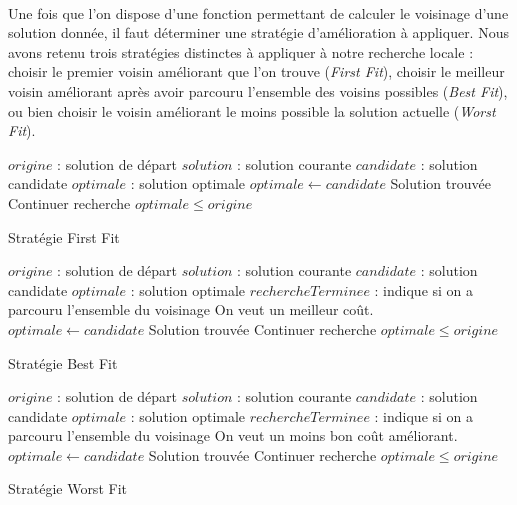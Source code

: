 \documentclass[a4paper,10pt]{report}
\begin{document}
\paragraph{}
  Une fois que l'on dispose d'une fonction permettant de calculer le voisinage
d'une solution donnée, il faut déterminer une stratégie d'amélioration à
appliquer. Nous avons retenu trois stratégies distinctes à appliquer à notre
recherche locale : choisir le premier voisin améliorant que l'on trouve
(\textit{First Fit}), choisir le meilleur voisin améliorant après avoir parcouru
l'ensemble des voisins possibles (\textit{Best Fit}), ou bien choisir le voisin
améliorant le moins possible la solution actuelle (\textit{Worst Fit}).

\begin{algorithm}[H]
  \begin{algorithmic}
    \Require $origine$ : solution de départ
    \Require $solution$ : solution courante
    \Require $candidate$ : solution candidate
    \Require $optimale$ : solution optimale
      \State $optimale \gets candidate$
      \State \Return Solution trouvée
    \Else
      \State \Return Continuer recherche
    \EndIf
    \Ensure $optimale \leq origine$
  \end{algorithmic}
  \caption{Stratégie First Fit}
\end{algorithm}

\begin{algorithm}[H]
  \begin{algorithmic}
    \Require $origine$ : solution de départ
    \Require $solution$ : solution courante
    \Require $candidate$ : solution candidate
    \Require $optimale$ : solution optimale
    \Require $rechercheTerminee$ : indique si on a parcouru l'ensemble du
voisinage
	\Comment On veut un meilleur coût.
	\State $optimale \gets candidate$
      \EndIf
    \EndIf
      \State \Return Solution trouvée
    \Else
      \State \Return Continuer recherche
    \EndIf
    \Ensure $optimale \leq origine$
  \end{algorithmic}
  \caption{Stratégie Best Fit}
\end{algorithm}

\begin{algorithm}[H]
  \begin{algorithmic}
    \Require $origine$ : solution de départ
    \Require $solution$ : solution courante
    \Require $candidate$ : solution candidate
    \Require $optimale$ : solution optimale
    \Require $rechercheTerminee$ : indique si on a parcouru l'ensemble du
voisinage
      \Comment On veut un moins bon coût améliorant.
	\State $optimale \gets candidate$
      \EndIf
    \EndIf
      \State \Return Solution trouvée
    \Else
      \State \Return Continuer recherche
    \EndIf
    \Ensure $optimale \leq origine$
  \end{algorithmic}
  \caption{Stratégie Worst Fit}
\end{algorithm}
\end{document}
